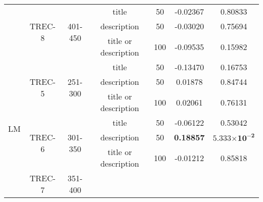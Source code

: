 \begin{table*}[hbt!]
\begin{tabular}{| c || c | c | c | c || c | c |}
    \cline{2-7}
    &   \multirow{3}{*}{TREC-8}
        &   \multirow{3}{*}{401-450}
            &   title & 50 & -0.02367 & 0.80833\\
    &   &   &   description & 50 & -0.03020 & 0.75694\\
    &   &   &   title or description & 100 & -0.09535 & 0.15982\\
    \hline%
        \multirow{12}{*}{LM}
    &   \multirow{3}{*}{TREC-5}
        & \multirow{3}{*}{251-300}
            &   title & 50 & -0.13470 & 0.16753\\
    &   &   &   description & 50 & 0.01878 & 0.84744\\
    &   &   &   title or description & 100 & 0.02061 & 0.76131\\
    \cline{2-7}
    &   \multirow{3}{*}{TREC-6}
        &   \multirow{3}{*}{301-350}
            &   title & 50 & -0.06122 & 0.53042\\
    &   &   &   description & 50 & \textbf{0.18857} & $\boldsymbol{5.333}\boldsymbol{\times}\boldsymbol{10}^{\boldsymbol{-2}}$\\
    &   &   &   title or description & 100 & -0.01212 & 0.85818\\
    \cline{2-7}
    &   \multirow{3}{*}{TREC-7}
        &   \multirow{3}{*}{351-400}

\end{tabular}
\end{table*}

